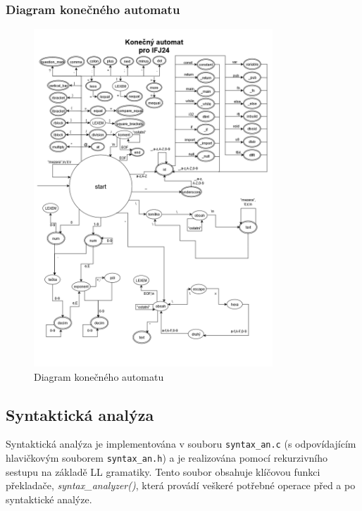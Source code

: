 \documentclass[a4paper, 12pt]{article}
\begin{document}
\newpage
\subsubsection{Diagram konečného automatu}
\begin{figure}[ht!]
    \begin{center}
        \includegraphics[origin=c, width=0.8\textwidth]{images/FSM_IFJ24.drawio.png}
        \caption{Diagram konečného automatu}
    \end{center}
\end{figure}

\newpage
{}
\subsection{Syntaktická analýza}

Syntaktická analýza je implementována v souboru \texttt{syntax\_an.c} (s odpovídajícím hlavičkovým souborem \texttt{syntax\_an.h}) a je realizována pomocí rekurzivního sestupu na základě LL gramatiky. Tento soubor obsahuje klíčovou funkci překladače, \textit{syntax\_analyzer()}, která provádí veškeré potřebné operace před a po syntaktické analýze.
\end{document}
